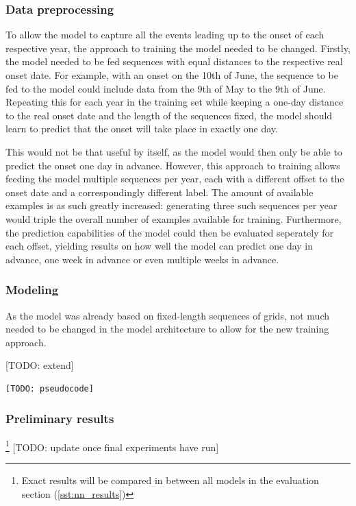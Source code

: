 \subsubsection{Data preprocessing}
\label{ssst:nn_e4_data}
To allow the model to capture all the events leading up to the onset of each respective year, the approach to training the model needed to be changed. Firstly, the model needed to be fed sequences with equal distances to the respective real onset date. For example, with an onset on the 10th of June, the sequence to be fed to the model could include data from the 9th of May to the 9th of June. Repeating this for each year in the training set while keeping a one-day distance to the real onset date and the length of the sequences fixed, the model should learn to predict that the onset will take place in exactly one day.

This would not be that useful by itself, as the model would then only be able to predict the onset one day in advance. However, this approach to training allows feeding the model multiple sequences per year, each with a different offset to the onset date and a correspondingly different label. The amount of available examples is as such greatly increased: generating three such sequences per year would triple the overall number of examples available for training. Furthermore, the prediction capabilities of the model could then be evaluated seperately for each offset, yielding results on how well the model can predict one day in advance, one week in advance or even multiple weeks in advance.

\subsubsection{Modeling}
\label{ssst:nn_e4_modeling}
As the model was already based on fixed-length sequences of grids, not much needed to be changed in the model architecture to allow for the new training approach.

[TODO: extend]

\begin{figure}[h]
\end{figure}

\begin{lstlisting}[language=Python]
  [TODO: pseudocode]
\end{lstlisting}

\subsubsection{Preliminary results}{\footnote{Exact results will be compared in between all models in the evaluation section (\cref{sst:nn_results})}}
\label{ssst:nn_e4_results}
[TODO: update once final experiments have run]


